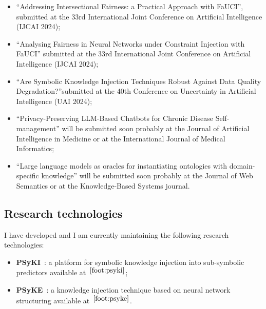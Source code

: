 \documentclass[]{scrartcl}
\begin{document}
    \begin{itemize}
        \item ``Addressing Intersectional Fairness: a Practical Approach with FaUCI'', submitted at the 33rd International Joint Conference on Artificial Intelligence (IJCAI 2024);
        \item ``Analysing Fairness in Neural Networks under Constraint Injection with FaUCI'' submitted at the 33rd International Joint Conference on Artificial Intelligence (IJCAI 2024);
        \item ``Are Symbolic Knowledge Injection Techniques Robust Against Data Quality Degradation?''submitted at the 40th Conference on Uncertainty in Artificial Intelligence (UAI 2024);
        \item ``Privacy-Preserving LLM-Based Chatbots for Chronic Disease Self-management'' will be submitted soon probably at the Journal of Artificial Intelligence in Medicine or at the International Journal of Medical Informatics;
        \item ``Large language models as oracles for instantiating ontologies with domain-specific knowledge'' will be submitted soon probably at the Journal of Web Semantics or at the Knowledge-Based Systems journal.
    \end{itemize}

    \subsection{Research technologies}
    \label{sec:done:technologies}
    I have developed and I am currently maintaining the following research technologies:
    \begin{itemize}
        \item \textbf{PSyKI}~\cite{psyki-extraamas2022}: a platform for symbolic knowledge injection into sub-symbolic predictors available at~$^{\ref{foot:psyki}}$;
        \item \textbf{PSyKE}~\cite{psyke-woa2021}: a knowledge injection technique based on neural network structuring available at~$^{\ref{foot:psyke}}$.
    \end{itemize}
\end{document}
